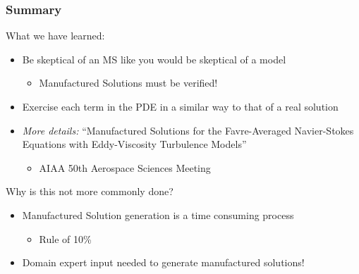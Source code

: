 \documentclass[mathserif]{beamer}
\newcommand{\sa}{\nu_{\mathrm{sa}}}
\begin{document}


 \begin{frame}
   \frametitle{Summary}  

  \begin{block}{What we have learned:}  
   \begin{itemize}
    \item Be skeptical of an MS like you would be skeptical of a model
	  \begin{itemize}
	   \item Manufactured Solutions must be verified!
	  \end{itemize}
    \item Exercise each term in the PDE in a similar way to that of a
	  real solution	
    \item {\em More details:} ``Manufactured Solutions for the Favre-Averaged
	  Navier-Stokes Equations with Eddy-Viscosity Turbulence
	  Models''
	  \begin{itemize}
	   \item AIAA 50th Aerospace Sciences Meeting
	  \end{itemize}
	 
   \end{itemize}
  \end{block}

  \begin{block}{Why is this not more commonly done?}  
   \begin{itemize}
    \item Manufactured Solution generation is a time consuming process
	  \begin{itemize}
	   \item Rule of 10\%
	  \end{itemize}
    \item Domain expert input needed to generate manufactured solutions!
   \end{itemize}
  \end{block}
 \end{frame}
\end{document}
